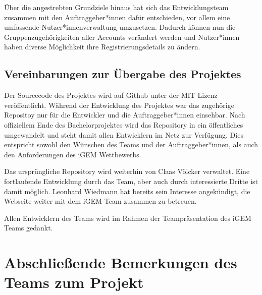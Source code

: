 \documentclass[accentcolor=tud0b,12pt,paper=a4]{tudreport}
\begin{document}
	Über die angestrebten Grundziele hinaus hat sich das Entwicklungsteam zusammen mit den Auftraggeber*innen dafür entschieden, vor allem eine umfassende Nutzer*innenverwaltung umzusetzen. Dadurch können nun die Gruppenzugehörigkeiten aller Accounts verändert werden und Nutzer*innen haben diverse Möglichkeit ihre Registrierungsdetails zu ändern.

	\section{Vereinbarungen zur Übergabe des Projektes}
	Der Sourcecode des Projektes wird auf Github unter der MIT Lizenz veröffentlicht. Während der Entwicklung des Projektes war das zugehörige Repositoy nur für die Entwickler und die Auftraggeber*innen einsehbar. Nach offiziellem Ende des Bachelorprojektes wird das Repository in ein öffentliches umgewandelt und steht damit allen Entwicklern im Netz zur Verfügung. Dies entspricht sowohl den Wünschen des Teams und der Auftraggeber*innen, als auch den Anforderungen des iGEM Wettbewerbs.

	Das ursprüngliche Repository wird weiterhin von Claas Völcker verwaltet. Eine fortlaufende Entwicklung durch das Team, aber auch durch interessierte Dritte ist damit möglich. Leonhard Wiedmann hat bereits sein Interesse angekündigt, die Webseite weiter mit dem iGEM-Team zusammen zu betreuen.

	Allen Entwicklern des Teams wird im Rahmen der Teampräsentation des iGEM Teams gedankt.


\chapter{Abschließende Bemerkungen des Teams zum Projekt}
\end{document}
